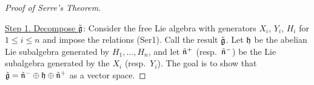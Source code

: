  \begin{proof}[Proof of Serre's Theorem]{\ }

    \underline{Step 1. Decompose $\tilde{\mathfrak{g}}$}: Consider the free Lie algebra with
    generators $X_i$, $Y_i$, $H_i$ for $1\le i\le n$ and impose the relations (Ser1).
    Call the result $\tilde {\mathfrak{g}}$. Let $\mathfrak{h}$ be the abelian Lie subalgebra generated by
    $H_1,\dots, H_n$, and let $\tilde {\mathfrak{n}}^+$ (resp.\ $\tilde {\mathfrak{n}}^-$) be the Lie
    subalgebra generated by the $X_i$ (resp.\ $Y_i$). The goal is to show that $\tilde
    {\mathfrak{g}} = \tilde {\mathfrak{n}}^- \oplus \mathfrak{h} \oplus \tilde {\mathfrak{n}}^+$ as a vector space.



\end{proof}

